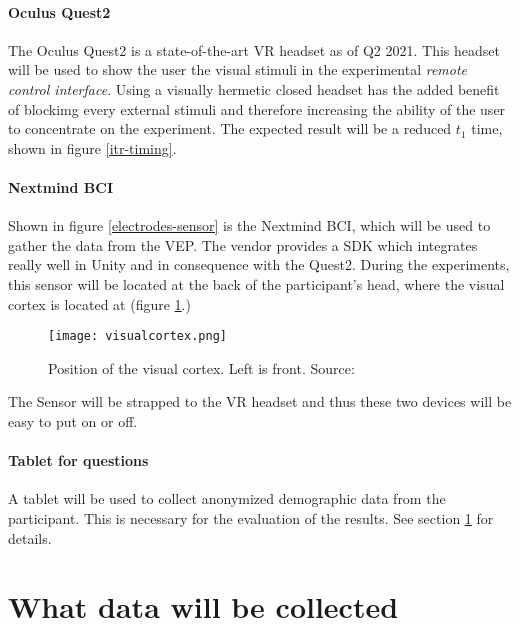             \paragraph{Oculus Quest2}

                The Oculus Quest2 is a state-of-the-art VR headset as of Q2 2021. This headset will be used to show the user the visual stimuli in the experimental \textit{remote control interface}. Using a visually hermetic closed headset has the added benefit of blockimg every external stimuli and therefore increasing the ability of the user to concentrate on the experiment. The expected result will be a reduced $t_{1}$ time, shown in figure \ref*{itr-timing}.

            \paragraph{Nextmind BCI}                

                Shown in figure \ref*{electrodes-sensor} is the Nextmind BCI, which will be used to gather the data from the VEP. The vendor provides a SDK which integrates really well in Unity and in consequence with the Quest2. During the experiments, this sensor will be located at the back of the participant's head, where the visual cortex is located at (figure \ref*{visual-cortex}.)

                \begin{figure}[h]     %
                    \centering
                    \texttt{[image: visualcortex.png]} 
                    \caption{Position of the visual cortex. Left is front. Source: \cite{Dr.KenBrodaBahm.14062021}}\label{visual-cortex}
                \end{figure}

                The Sensor will be strapped to the VR headset and thus these two devices will be easy to put on or off.

            \paragraph{Tablet for questions}

                A tablet will be used to collect anonymized demographic data from the participant. This is necessary for the evaluation of the results. See section \ref*{datacollection} for details.

        \section{What data will be collected}\label{datacollection}

